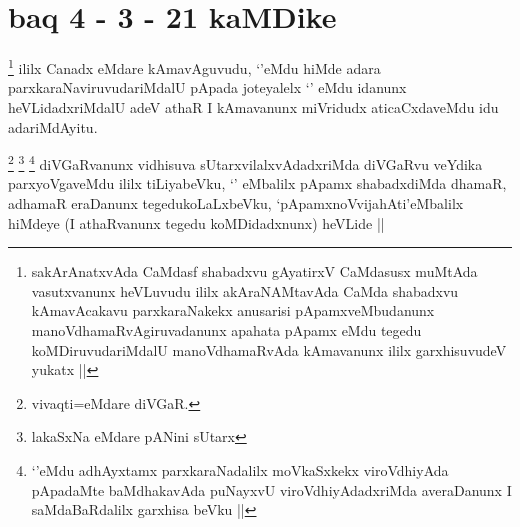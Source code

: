 
\section*{baq 4 - 3 - 21 kaMDike}


\begin{artha}
\footnote{sakArAnatxvAda CaMdasf shabadxvu gAyatirxV CaMdasusx muMtAda vasutxvanunx heVLuvudu ililx akAraNAMtavAda CaMda shabadxvu kAmavAcakavu parxkaraNakekx anusarisi pApamxveMbudanunx manoVdhamaRvAgiruvadanunx apahata pApamx eMdu tegedu koMDiruvudariMdalU manoVdhamaRvAda kAmavanunx ililx garxhisuvudeV yukatx ||}
ililx Canadx eMdare kAmavAguvudu, `\stext'eMdu hiMde adara parxkaraNaviruvudariMdalU pApada joteyalelx `\stext' eMdu idanunx heVLidadxriMdalU adeV athaR I kAmavanunx miVridudx aticaCxdaveMdu idu adariMdAyitu.
\end{artha}


\begin{artha}
\footnote{vivaqti=eMdare diVGaR.}
\footnote{lakaSxNa eMdare pANini sUtarx}
\footnote{`\stext'eMdu adhAyxtamx parxkaraNadalilx moVkaSxkekx viroVdhiyAda pApadaMte baMdhakavAda puNayxvU viroVdhiyAdadxriMda averaDanunx I saMdaBaRdalilx garxhisa beVku ||}
diVGaRvanunx vidhisuva sUtarxvilalxvAdadxriMda diVGaRvu veYdika parxyoVgaveMdu ililx tiLiyabeVku, `\stext' eMbalilx pApamx shabadxdiMda dhamaR, adhamaR eraDanunx tegedukoLaLxbeVku, `pApamxnoVvija{hA}ti'eMbalilx hiMdeye (I athaRvanunx tegedu koMDidadxnunx) heVLide ||
\end{artha}


